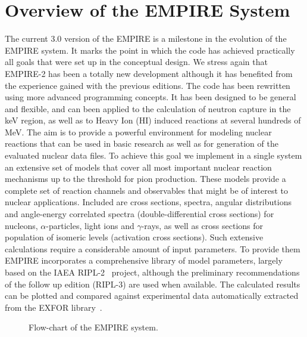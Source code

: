 \documentclass[twocolumn,amsmath,amssymb,10pt,groupedaddress,a4paper]{revtex4}
\begin{document}
\section{Overview of the EMPIRE System}
The current 3.0 version of the EMPIRE is a milestone in the evolution of the EMPIRE system. It marks the point in which the code has achieved practically all goals that were set up in the conceptual design. We stress again that EMPIRE-2 has been a totally new development although it has benefited from the experience
gained with the previous editions. The code
has been rewritten using more advanced programming concepts.
It has been designed to be general and flexible, and can been applied
to the calculation of neutron capture in the keV region, as well as
to Heavy Ion (HI) induced reactions at several hundreds of MeV. The aim is to
provide a powerful environment for modeling nuclear reactions that can be used
in basic research as well as for generation of the evaluated nuclear data files.
To achieve this goal we implement in a single system an extensive set of
models that cover all most important nuclear reaction mechanisms up to the
threshold for pion production. These models provide a complete set of reaction channels and
observables that might be of interest to nuclear applications. Included are
cross sections, spectra, angular distributions and angle-energy correlated spectra
(double-differential cross sections) for nucleons, $\alpha$-particles, light ions
and $\gamma$-rays, as well as cross sections for population of isomeric levels
(activation cross sections). Such extensive calculations require a considerable amount
of input parameters. To provide them EMPIRE incorporates a comprehensive library of model
parameters, largely based on the IAEA RIPL-2~\cite{RIPL-2} project,
although the preliminary recommendations of the follow up edition (RIPL-3) are used when available. The calculated results can be plotted and compared against experimental data automatically extracted
from the EXFOR library~\cite{EXFOR}.

\begin{figure*}[htbp]
\caption{Flow-chart of the EMPIRE system.}
\label{fig:empire-flowchart}
\end{figure*}
\end{document}
